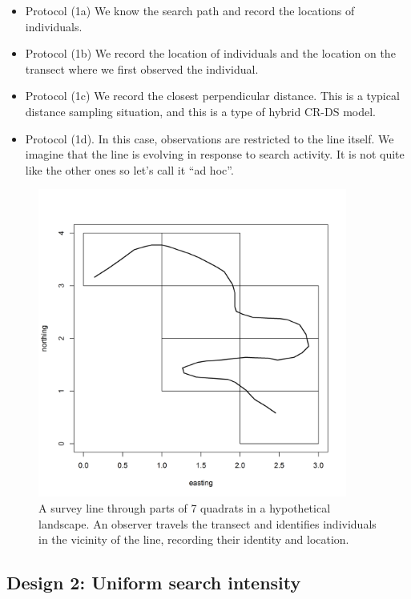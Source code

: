 \begin{itemize}
 \item[] Protocol (1a) We know the search path and record the locations of individuals.
 \item[] Protocol (1b) We record the location of individuals and
   the location on the transect where we first observed the individual.
 \item[] Protocol (1c) We record
the closest perpendicular distance. This is a typical
   distance sampling situation, and this is a type of hybrid CR-DS model.
 \item[] Protocol (1d). In this case, observations are restricted to
   the line itself. We imagine that the line is evolving in response
   to search activity. It is not quite like the other ones so let's
   call it ``ad hoc''.
 \end{itemize}


\begin{figure}
\centering
\includegraphics[width=4in,height=4in]{Ch15-searchencounter/figs/snakeline.png}
\caption{
A survey line through parts of 7 quadrats in a
  hypothetical landscape. An observer travels the transect and
  identifies individuals in the vicinity of the line, recording their
  identity and location.
}
\label{searchencounter.fig.snakeline}
\end{figure}


\subsection{Design 2: Uniform search intensity}

